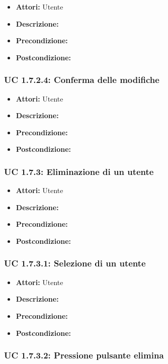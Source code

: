 \begin{itemize}
\item \textbf{Attori:} Utente
\item \textbf{Descrizione:} 
\item \textbf{Precondizione:} 
\item \textbf{Postcondizione:} 
\end{itemize}

\subsubsection{UC 1.7.2.4: Conferma delle modifiche}

\begin{itemize}
\item \textbf{Attori:} Utente
\item \textbf{Descrizione:} 
\item \textbf{Precondizione:} 
\item \textbf{Postcondizione:} 
\end{itemize}

\subsubsection{UC 1.7.3: Eliminazione di un utente}

\begin{itemize}
\item \textbf{Attori:} Utente
\item \textbf{Descrizione:} 
\item \textbf{Precondizione:} 
\item \textbf{Postcondizione:} 
\end{itemize}

\subsubsection{UC 1.7.3.1: Selezione di un utente}

\begin{itemize}
\item \textbf{Attori:} Utente
\item \textbf{Descrizione:} 
\item \textbf{Precondizione:} 
\item \textbf{Postcondizione:} 
\end{itemize}

\subsubsection{UC 1.7.3.2: Pressione pulsante elimina}

